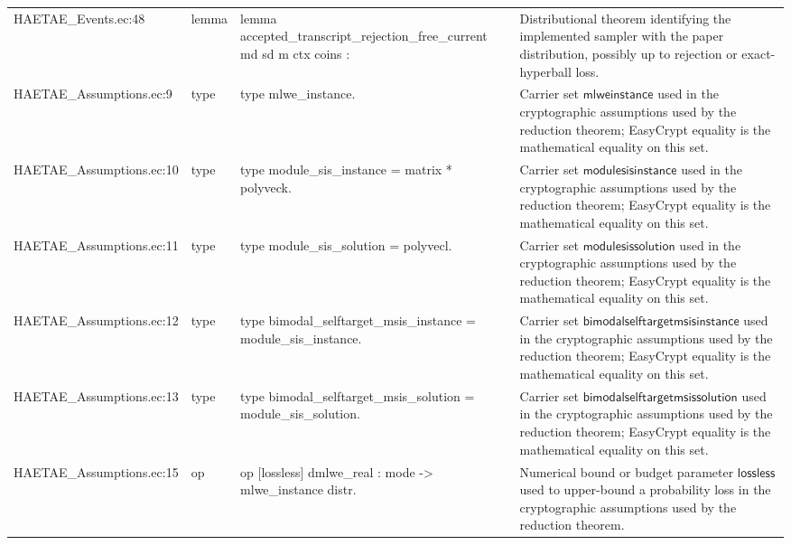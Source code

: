 \documentclass[10pt]{article}
\begin{document}
\begin{longtable}{L{0.11\textwidth}L{0.055\textwidth}L{0.385\textwidth}L{0.41\textwidth}}
HAETAE\_\allowbreak{}Events.\allowbreak{}ec:\allowbreak{}48 & lemma & {\ttfamily\scriptsize lemma accepted\_\allowbreak{}transcript\_\allowbreak{}rejection\_\allowbreak{}free\_\allowbreak{}current md sd m ctx coins :} & Distributional theorem identifying the implemented sampler with the paper distribution, possibly up to rejection or exact-hyperball loss. \\
HAETAE\_\allowbreak{}Assumptions.\allowbreak{}ec:\allowbreak{}9 & type & {\ttfamily\scriptsize type mlwe\_\allowbreak{}instance.} & Carrier set $\mathsf{mlweinstance}$ used in the cryptographic assumptions used by the reduction theorem; EasyCrypt equality is the mathematical equality on this set. \\
HAETAE\_\allowbreak{}Assumptions.\allowbreak{}ec:\allowbreak{}10 & type & {\ttfamily\scriptsize type module\_\allowbreak{}sis\_\allowbreak{}instance = matrix * polyveck.} & Carrier set $\mathsf{modulesisinstance}$ used in the cryptographic assumptions used by the reduction theorem; EasyCrypt equality is the mathematical equality on this set. \\
HAETAE\_\allowbreak{}Assumptions.\allowbreak{}ec:\allowbreak{}11 & type & {\ttfamily\scriptsize type module\_\allowbreak{}sis\_\allowbreak{}solution = polyvecl.} & Carrier set $\mathsf{modulesissolution}$ used in the cryptographic assumptions used by the reduction theorem; EasyCrypt equality is the mathematical equality on this set. \\
HAETAE\_\allowbreak{}Assumptions.\allowbreak{}ec:\allowbreak{}12 & type & {\ttfamily\scriptsize type bimodal\_\allowbreak{}selftarget\_\allowbreak{}msis\_\allowbreak{}instance = module\_\allowbreak{}sis\_\allowbreak{}instance.} & Carrier set $\mathsf{bimodalselftargetmsisinstance}$ used in the cryptographic assumptions used by the reduction theorem; EasyCrypt equality is the mathematical equality on this set. \\
HAETAE\_\allowbreak{}Assumptions.\allowbreak{}ec:\allowbreak{}13 & type & {\ttfamily\scriptsize type bimodal\_\allowbreak{}selftarget\_\allowbreak{}msis\_\allowbreak{}solution = module\_\allowbreak{}sis\_\allowbreak{}solution.} & Carrier set $\mathsf{bimodalselftargetmsissolution}$ used in the cryptographic assumptions used by the reduction theorem; EasyCrypt equality is the mathematical equality on this set. \\
HAETAE\_\allowbreak{}Assumptions.\allowbreak{}ec:\allowbreak{}15 & op & {\ttfamily\scriptsize op [lossless] dmlwe\_\allowbreak{}real : mode -\textgreater{} mlwe\_\allowbreak{}instance distr.} & Numerical bound or budget parameter $\mathsf{lossless}$ used to upper-bound a probability loss in the cryptographic assumptions used by the reduction theorem. \\

\end{longtable}
\end{document}

